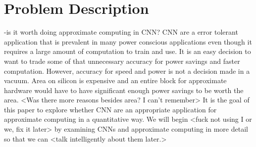 \documentclass[conference]{IEEEtran}
\begin{document}
%



\section{Problem Description}
-is it worth doing approximate computing in CNN?
CNN are a error tolerant application that is prevalent in many power conscious applications even though it requires a large amount of computation to train and use. It is an easy decision to want to trade some of that unnecessary accuracy for power savings and faster computation. However, accuracy for speed and power is not a decision made in a vacuum. Area on silicon is expensive and an entire block for approximate hardware would have to have significant enough power savings to be worth the area. <Was there more reasons besides area? I can't remember> It is the goal of this paper to explore whether CNN are an appropriate application for approximate computing in a quantitative way. We will begin <fuck not using I or we, fix it later> by examining CNNs and approximate computing in more detail so that we can <talk intelligently about them later.>
\end{document}
